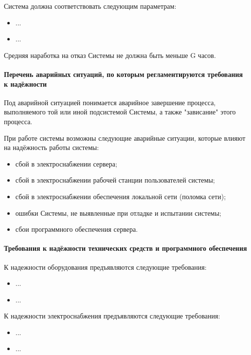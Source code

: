 \documentclass[a4paper, 12pt]{article}		%
\begin{document}
Система должна соответствовать следующим параметрам:
\begin{itemize}
\item ...
\item ...
\end{itemize}

Средняя наработка на отказ Системы не должна быть меньше G часов.

\paragraph{Перечень аварийных ситуаций, по которым регламентируются требования к надёжности\\}

Под аварийной ситуацией понимается аварийное завершение процесса, выполняемого той или иной подсистемой Системы, а также "зависание" этого процесса.

При работе системы возможны следующие аварийные ситуации, которые влияют на надёжность работы системы:
\begin{itemize}
\item сбой в электроснабжении сервера;
\item сбой в электроснабжении рабочей станции пользователей системы;
\item сбой в электроснабжении обеспечения локальной сети (поломка сети);
\item ошибки Системы, не выявленные при отладке и испытании системы;
\item сбои программного обеспечения сервера.
\end{itemize}

\paragraph{Требования к надёжности технических средств и программного обеспечения\\}

К надежности оборудования предъявляются следующие требования:
\begin{itemize}
\item ...
\item ...
\end{itemize}

К надежности электроснабжения предъявляются следующие требования:
\begin{itemize}
\item ...
\item ...
\end{itemize}
\end{document}
